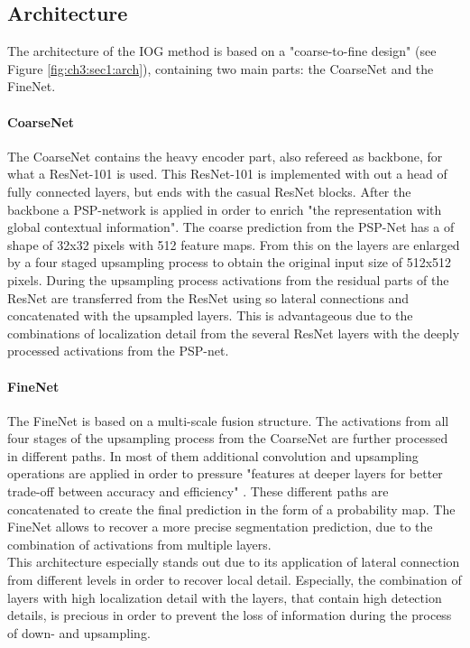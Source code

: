 \subsection{Architecture}\label{ord:ch3:sec1:subsec2}

The architecture of the IOG method is based on a "coarse-to-fine design" \cite{Zha2020} (see Figure \ref{fig:ch3:sec1:arch}), containing two main parts: the CoarseNet and the FineNet.

\paragraph{CoarseNet}
The CoarseNet contains the heavy encoder part, also refereed as backbone, for what a ResNet-101 is used. 
This ResNet-101 is implemented with out a head of fully connected layers, but ends with the casual ResNet blocks. 
After the backbone a PSP-network is applied in order to enrich "the representation with global contextual information"\cite{Zha2020}.
The coarse prediction from the PSP-Net has a of shape of 32x32 pixels with 512 feature maps. 
From this on the layers are enlarged by a four staged upsampling process to obtain the original input size of 512x512 pixels. 
During the upsampling process activations from the residual parts of the ResNet are transferred from the ResNet using so lateral connections and concatenated with the upsampled layers. 
This is advantageous due to the combinations of localization detail from the several ResNet layers with the deeply processed activations from the PSP-net.

\paragraph{FineNet}
The FineNet is based on a multi-scale fusion structure. 
The activations from all four stages of the upsampling process from the CoarseNet are further processed in different paths. 
In most of them additional convolution and upsampling operations are applied in order to pressure "features at deeper layers for better trade-off between accuracy and efficiency" \cite{Zha2020}.
These different paths are concatenated to create the final prediction in the form of a probability map.
The FineNet allows to recover a more precise segmentation prediction, due to the combination of activations from multiple layers. 
\\
This architecture especially stands out due to its application of lateral connection from different levels in order to recover local detail. 
Especially, the combination of layers with high localization detail with the layers, that contain high detection details, is precious in order to prevent the loss of information during the process of down- and upsampling.

